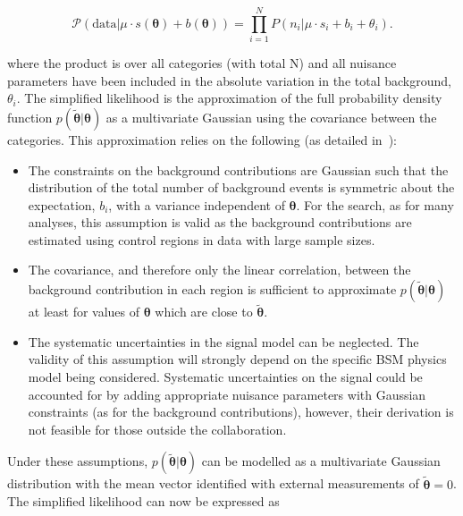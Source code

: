 \begin{equation}
\mathcal{P}(\mathrm{data}|\mu\cdot s(\boldsymbol{\theta}) + b(\boldsymbol{\theta})) = \prod_{i=1}^{N} P(n_{i}|\mu \cdot s_{i}+b_{i}+\theta_{i}).
\label{eq:poisson-prob}
\end{equation}

where the product is over all categories (with total N) and all nuisance parameters
have been included in the absolute variation in the total background, $\theta_i$. The simplified likelihood 
is the approximation of the full probability density function $p(\tilde{\boldsymbol{\theta}}|\boldsymbol{\theta})$
as a multivariate Gaussian using the covariance between the categories. This approximation relies 
on the following (as detailed in~\cite{simp-lik}):
\begin{itemize}
\item{The constraints on the background contributions are Gaussian such that the distribution of 
the total number of background events is symmetric about the expectation, $b_{i}$, 
with a variance independent of $\boldsymbol{\theta}$. For the \alphat search, as for many analyses, 
this assumption is valid as the background contributions are estimated using control regions in 
data with large sample sizes.}

\item{The covariance, and therefore only the linear correlation, 
between the background contribution in each region is sufficient 
to approximate $p(\tilde{\boldsymbol{\theta}}|\boldsymbol{\theta})$ 
at least for values of $\boldsymbol{\theta}$ which are close to $\tilde{\boldsymbol{\theta}}$.}

\item{The systematic uncertainties in the signal model can be neglected. The validity of 
this assumption will strongly depend on the specific BSM physics model being considered. 
Systematic uncertainties on the signal could be accounted for by adding appropriate 
nuisance parameters with Gaussian constraints (as for the background contributions), however,
their derivation is not feasible for those outside the collaboration.} 
\end{itemize}

Under these assumptions, $p(\tilde{\boldsymbol{\theta}}|\boldsymbol{\theta})$ can be modelled as a multivariate 
Gaussian distribution with the mean vector identified with external measurements of 
$\tilde{\boldsymbol{\theta}}=0$. The simplified likelihood can now be expressed as

